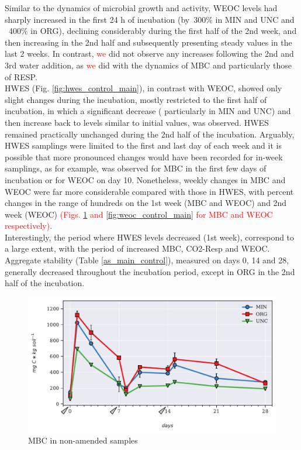 \documentclass[12pt]{report}
\newcommand{\myRed}[1]{\textcolor{red}{#1}} %
\begin{document}
		Similar to the dynamics of microbial growth and activity, WEOC  levels had  sharply increased in the first 24 h of incubation (by~300$\%$ in MIN and UNC and ~400$\%$ in ORG), declining considerably during the first half of the 2nd week, and then increasing in the 2nd half and subsequently presenting steady values in the last 2 weeks. In contrast, \myRed{we} did not observe any increases following the 2nd and 3rd water addition, as \myRed{we} did with the dynamics of MBC and particularly those of RESP.  \\
		HWES (Fig. \ref{fig:hwes_control_main}), in contrast with WEOC, showed only slight changes during the incubation, mostly restricted to the first half of incubation, in which a significant decrease ( particularly in MIN and UNC) and then increase back to levels similar to initial values, was observed. HWES remained practically unchanged during the 2nd half of the incubation. Arguably, HWES samplings were limited to the first and last day of each week and it is possible that more pronounced changes would have been recorded for in-week samplings, as for example, was observed for MBC in the first few days of incubation or for WEOC on day 10. Nonetheless, weekly changes in MBC and WEOC were far more considerable compared with those in HWES, with percent changes in the range of hundreds on the 1st week (MBC and WEOC) and  2nd week (WEOC) \myRed{(Figs. \ref{fig:mbc_control_main} and \ref{fig:weoc_control_main} for MBC and WEOC respectively)}. \\
		Interestingly, the period where HWES levels decreased (1st week), correspond to a large extent, with the period of increased MBC, CO2-Resp and WEOC.\\
		Aggregate stability (Table \ref{as_main_control}), measured on days 0, 14 and 28, generally decreased throughout the incubation period, except in ORG in the 2nd half of the incubation.
		
		\begin{figure}[H]
			\centering
			\includegraphics[scale=0.8]{thesis_figures/main_incubation/control/MBC.pdf}
			\caption{MBC in non-amended samples}
			\label{fig:mbc_control_main}
		\end{figure}
		
\end{document}
